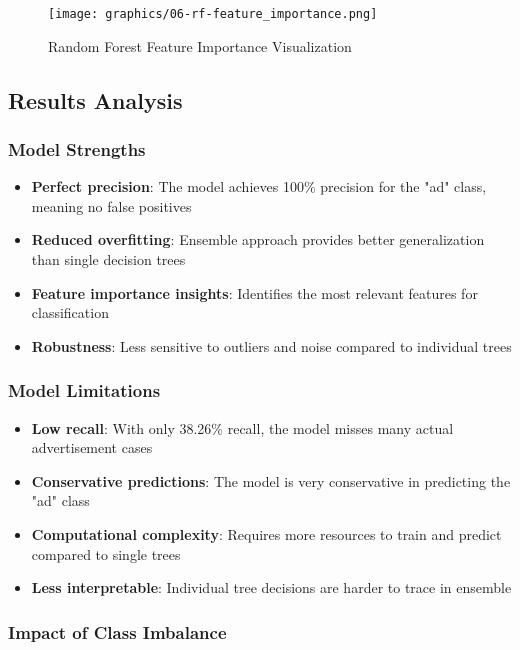 \begin{figure}[h]
\centering
\texttt{[image: graphics/06-rf-feature\_importance.png]}
\caption{Random Forest Feature Importance Visualization}
\end{figure}

\subsection{Results Analysis}

\subsubsection{Model Strengths}

\begin{itemize}
    \item \textbf{Perfect precision}: The model achieves 100\% precision for the "ad" class, meaning no false positives
    \item \textbf{Reduced overfitting}: Ensemble approach provides better generalization than single decision trees
    \item \textbf{Feature importance insights}: Identifies the most relevant features for classification
    \item \textbf{Robustness}: Less sensitive to outliers and noise compared to individual trees
\end{itemize}

\subsubsection{Model Limitations}

\begin{itemize}
    \item \textbf{Low recall}: With only 38.26\% recall, the model misses many actual advertisement cases
    \item \textbf{Conservative predictions}: The model is very conservative in predicting the "ad" class
    \item \textbf{Computational complexity}: Requires more resources to train and predict compared to single trees
    \item \textbf{Less interpretable}: Individual tree decisions are harder to trace in ensemble
\end{itemize}

\subsubsection{Impact of Class Imbalance}

